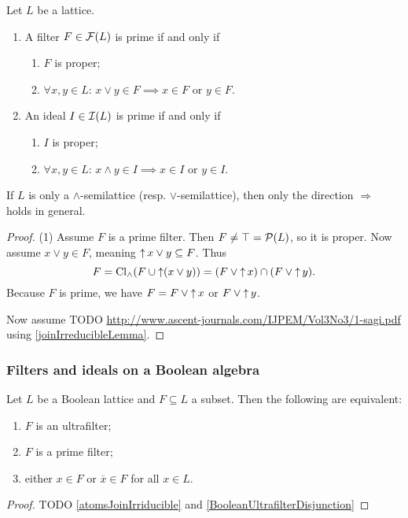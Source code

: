 \begin{proposition}
Let $L$ be a lattice.
\begin{enumerate}
\item A filter $F\in \operatorname{\mathcal{F}}(L)$ is prime \textup{if and only if}
\begin{enumerate}
\item $F$ is proper;
\item $\forall x,y\in L$: $x\vee y \in F \implies x\in F$ or $y\in F$.
\end{enumerate}
\item An ideal $I\in \operatorname{\mathcal{I}}(L)$ is prime \textup{if and only if}
\begin{enumerate}
\item $I$ is proper;
\item $\forall x,y\in L$: $x\wedge y \in I \implies x\in I$ or $y\in I$.
\end{enumerate}
\end{enumerate}
\end{proposition}
If $L$ is only a $\wedge$-semilattice (resp. $\vee$-semilattice), then only the direction $\Rightarrow$ holds in general.
\begin{proof}
(1) Assume $F$ is a prime filter. Then $F \neq \top = \operatorname{\mathcal{P}}(L)$, so it is proper. Now assume $x\vee y\in F$, meaning $\operatorname{\uparrow} x\vee y \subseteq F$. Thus
\[ F = \operatorname{Cl}_\wedge (F\cup \operatorname{\uparrow}(x\vee y)) = (F\vee \operatorname{\uparrow} x) \cap (F\vee \operatorname{\uparrow} y). \]
Because $F$ is prime, we have $F = F\vee \operatorname{\uparrow} x$ or $F\vee \operatorname{\uparrow} y$.

Now assume TODO \url{http://www.ascent-journals.com/IJPEM/Vol3No3/1-sagi.pdf} using \ref{joinIrreducibleLemma}.
\end{proof}

\subsubsection{Filters and ideals on a Boolean algebra}

\begin{proposition} \label{booleanMaximalFiltersIdeals}
Let $L$ be a Boolean lattice and $F\subseteq L$ a subset. Then the following are equivalent:
\begin{enumerate}
\item $F$ is an ultrafilter;
\item $F$ is a prime filter;
\item either $x\in F$ or $\overline{x}\in F$ for all $x\in L$.
\end{enumerate}
\end{proposition}
\begin{proof}
TODO \ref{atomsJoinIrriducible} and \ref{BooleanUltrafilterDisjunction}
\end{proof}

